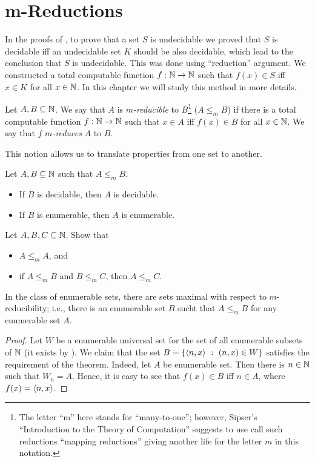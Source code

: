 \chapter{m-Reductions}
In the proofs of , to prove
that a set $S$ is undecidable we proved that $S$ is decidable iff an undecidable
set $K$ should be also decidable, which lead to the conclusion that $S$ is
undecidable. This was done using ``reduction'' argument. We constructed a total
computable function $f : {\mathbb{N}} \to {\mathbb{N}}$ such that $f(x) \in S$ iff $x \in K$ for all
$x \in {\mathbb{N}}$. In
this chapter we will study this method in more details.

\begin{definition}
  Let $A, B \subseteq {\mathbb{N}}$. We say that $A$ is \emph{$m$-reducible} to
  $B$\footnote{%
    The letter ``m'' here stands for ``many-to-one''; however, Sipser's
    ``Introduction to the Theory of Computation'' suggests to use call such
    reductions ``mapping reductions'' giving another life for the letter $m$ in
    this notation.
  }
  ($A \le_m B$) if there is a total computable function $f : {\mathbb{N}} \to {\mathbb{N}}$ such
  that $x \in A$ iff $f(x) \in B$ for all $x \in {\mathbb{N}}$. We say that $f$
  \emph{$m$-reduces} $A$ to $B$.
\end{definition}

This notion allows us to translate properties from one set to another.
\begin{theorem}
\label{theorem:m-reduction-complexity-preservation}
  Let $A, B \subseteq {\mathbb{N}}$ such that $A \le_m B$.
  \begin{itemize}
    \item If $B$ is decidable, then $A$ is decidable.
    \item If $B$ is enumerable, then $A$ is enumerable.
  \end{itemize}
\end{theorem}

\begin{exercise}
  Let $A, B, C \subseteq {\mathbb{N}}$. Show that
  \begin{itemize}
    \item $A \le_m A$, and 
    \item if $A \le_m B$ and $B \le_m C$, then $A \le_m C$.
  \end{itemize}
\end{exercise}

\begin{theorem}
  In the class of enumerable sets, there are sets maximal with respect to
  $m$-reducibility; i.e., there is an enumerable set $B$ sucht that $A \le_m B$
  for any enumerable set $A$.
\end{theorem}
\begin{proof}
  Let $W$ be a enumerable universal set for the set of all enumerable subsets of
  ${\mathbb{N}}$ (it exists by ). 
  We claim that the set $B = \set[(n, x) \in W]{\pair{n}{x}}$ satisfies the
  requirement of the theorem. Indeed, let $A$ be enumerable set. Then there is
  $n \in {\mathbb{N}}$ such that $W_n = A$. Hence, it is easy to see that $f(x) \in B$ iff 
  $n \in A$, where $f(x) = \langle {n}, {x} \rangle$.
\end{proof}

